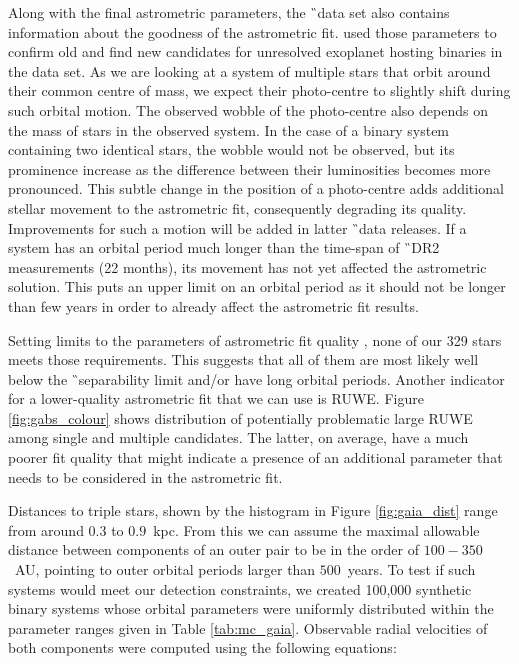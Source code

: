 Along with the final astrometric parameters, the \G\ data set also contains information about the goodness of the astrometric fit. \citet{2018RNAAS...2b..20E} used those parameters to confirm old and find new candidates for unresolved exoplanet hosting binaries in the data set. As we are looking at a system of multiple stars that orbit around their common centre of mass, we expect their photo-centre to slightly shift during such orbital motion. The observed wobble of the photo-centre also depends on the mass of stars in the observed system. In the case of a binary system containing two identical stars, the wobble would not be observed, but its prominence increase as the difference between their luminosities becomes more pronounced. This subtle change in the position of a photo-centre adds additional stellar movement to the astrometric fit, consequently degrading its quality. Improvements for such a motion will be added in latter \G\ data releases. If a system has an orbital period much longer than the time-span of \G\ DR2 measurements (22 months), its movement has not yet affected the astrometric solution. This puts an upper limit on an orbital period as it should not be longer than few years in order to already affect the astrometric fit results. 

Setting limits to the parameters of astrometric fit quality \citep[\texttt{astrometric\_excess\_noise}~>~5, and \texttt{astrometric\_gof\_al}~>~20 as proposed by][]{2018RNAAS...2b..20E}, none of our 329 stars meets those requirements. This suggests that all of them are most likely well below the \G\ separability limit and/or have long orbital periods. Another indicator for a lower-quality astrometric fit that we can use is RUWE. Figure \ref{fig:gabs_colour} shows distribution of potentially problematic large RUWE among single and multiple candidates. The latter, on average, have a much poorer fit quality that might indicate a presence of an additional parameter that needs to be considered in the astrometric fit. 

Distances to triple stars, shown by the histogram in Figure \ref{fig:gaia_dist} range from around $0.3$ to $0.9$~kpc. From this we can assume the maximal allowable distance between components of an outer pair to be in the order of $100-350$~AU, pointing to outer orbital periods larger than $500$~years. To test if such systems would meet our detection constraints, we created 100,000 synthetic binary systems whose orbital parameters were uniformly distributed within the parameter ranges given in Table \ref{tab:mc_gaia}. Observable radial velocities of both components were computed using the following equations:

